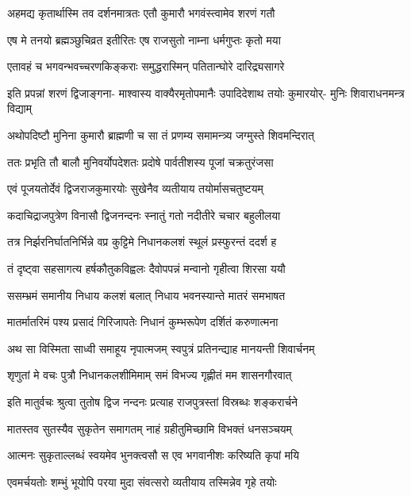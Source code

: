 \begin{center}
\twolineshloka
{अहमद्य कृतार्थास्मि तव दर्शनमात्रतः}
{एतौ कुमारौ भगवंस्त्वामेव शरणं गतौ} %

\twolineshloka
{एष मे तनयो ब्रह्मञ्छुचिव्रत इतीरितः}
{एष राजसुतो नाम्ना धर्मगुप्तः कृतो मया} %

\twolineshloka
{एतावहं च भगवन्भवच्चरणकिङ्कराः}
{समुद्धरास्मिन् पतितान्घोरे दारिद्र्यसागरे} %

\fourlineindentedshloka
{इति प्रपन्नां शरणं द्विजाङ्गना-}
{माश्वास्य वाक्यैरमृतोपमानैः}
{उपादिदेशाथ तयोः कुमारयोर्-}
{मुनिः शिवाराधनमन्त्र विद्याम्} %

\twolineshloka
{अथोपदिष्टौ मुनिना कुमारौ ब्राह्मणी च सा}
{तं प्रणम्य समामन्त्र्य जग्मुस्ते शिवमन्दिरात्} %

\twolineshloka
{ततः प्रभृति तौ बालौ मुनिवर्योपदेशतः}
{प्रदोषे पार्वतीशस्य पूजां चक्रतुरंजसा} %

\twolineshloka
{एवं पूजयतोर्देवं द्विजराजकुमारयोः}
{सुखेनैव व्यतीयाय तयोर्मासचतुष्टयम्} %

\twolineshloka
{कदाचिद्राजपुत्रेण विनासौ द्विजनन्दनः}
{स्नातुं गतो नदीतीरे चचार बहुलीलया} %

\twolineshloka
{तत्र निर्झरनिर्घातनिर्भिन्ने वप्र कुट्टिमे}
{निधानकलशं स्थूलं प्रस्फुरन्तं ददर्श ह} %

\twolineshloka
{तं दृष्ट्वा सहसागत्य हर्षकौतुकविह्वलः}
{दैवोपपन्नं मन्वानो गृहीत्वा शिरसा ययौ} %

\twolineshloka
{ससम्भ्रमं समानीय निधाय कलशं बलात्}
{निधाय भवनस्यान्ते मातरं समभाषत} %

\twolineshloka
{मातर्मातरिमं पश्य प्रसादं गिरिजापतेः}
{निधानं कुम्भरूपेण दर्शितं करुणात्मना} %

\twolineshloka
{अथ सा विस्मिता साध्वी समाहूय नृपात्मजम्}
{स्वपुत्रं प्रतिनन्द्याह मानयन्ती शिवार्चनम्} %

\twolineshloka
{शृणुतां मे वचः पुत्रौ निधानकलशीमिमाम्}
{समं विभज्य गृह्णीतं मम शासनगौरवात्} %

\twolineshloka
{इति मातुर्वचः श्रुत्वा तुतोष द्विज नन्दनः}
{प्रत्याह राजपुत्रस्तां विस्रब्धः शङ्करार्चने} %

\twolineshloka
{मातस्तव सुतस्यैव सुकृतेन समागतम्}
{नाहं ग्रहीतुमिच्छामि विभक्तं धनसञ्चयम्} %

\twolineshloka
{आत्मनः सुकृताल्लब्धं स्वयमेव भुनक्त्वसौ}
{स एव भगवानीशः करिष्यति कृपां मयि} %

\twolineshloka
{एवमर्चयतोः शम्भुं भूयोपि परया मुदा}
{संवत्सरो व्यतीयाय तस्मिन्नेव गृहे तयोः} %


\end{center}
